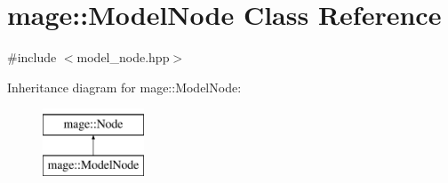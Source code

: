 \hypertarget{classmage_1_1_model_node}{}\section{mage\+:\+:Model\+Node Class Reference}
\label{classmage_1_1_model_node}


{\ttfamily \#include $<$model\+\_\+node.\+hpp$>$}

Inheritance diagram for mage\+:\+:Model\+Node\+:\begin{figure}[H]
\begin{center}
\leavevmode
\includegraphics[height=2.000000cm]{classmage_1_1_model_node}
\end{center}
\end{figure}
